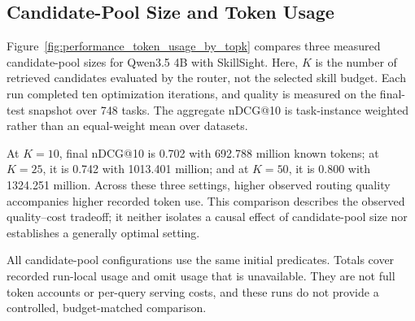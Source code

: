 \subsection{Candidate-Pool Size and Token Usage}
\label{app:candidate-pool-tokens}
Figure~\ref{fig:performance_token_usage_by_topk} compares three measured candidate-pool sizes for Qwen3.5 4B with SkillSight. Here, $K$ is the number of retrieved candidates evaluated by the router, not the selected skill budget. Each run completed ten optimization iterations, and quality is measured on the final-test snapshot over 748 tasks. The aggregate nDCG@10 is task-instance weighted rather than an equal-weight mean over datasets.

At $K=10$, final nDCG@10 is 0.702 with 692.788 million known tokens; at $K=25$, it is 0.742 with 1013.401 million; and at $K=50$, it is 0.800 with 1324.251 million. Across these three settings, higher observed routing quality accompanies higher recorded token use. This comparison describes the observed quality--cost tradeoff; it neither isolates a causal effect of candidate-pool size nor establishes a generally optimal setting.

All candidate-pool configurations use the same initial predicates. Totals cover recorded run-local usage and omit usage that is unavailable. They are not full token accounts or per-query serving costs, and these runs do not provide a controlled, budget-matched comparison.


